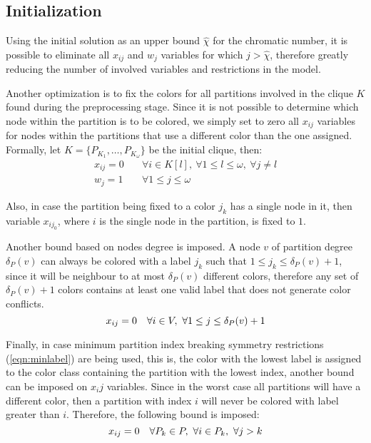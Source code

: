 \subsection{Initialization}

Using the initial solution as an upper bound $\hat{\chi}$ for the chromatic number, it is possible to eliminate all $x_{ij}$ and $w_j$ variables for which  $j > \hat{\chi}$, therefore greatly reducing the number of involved variables and restrictions in the model.

Another optimization is to fix the colors for all partitions involved in the clique $K$ found during the preprocessing stage. Since it is not possible to determine which node within the partition is to be colored, we simply set to zero all $x_{ij}$ variables for nodes within the partitions that use a different color than the one assigned. Formally, let $K = \{ P_{K_1}, \ldots, P_{K_\omega} \}$ be the initial clique, then:
\begin{align*}
x_{ij} = 0 \quad &\forall i \in K[l],\ \forall 1 \leq l \leq \omega,\ \forall j \neq l \\
w_j = 1 \quad &\forall 1 \leq j \leq \omega
\end{align*}

Also, in case the partition being fixed to a color $j_k$ has a single node in it, then variable $x_{ij_0}$, where $i$ is the single node in the partition, is fixed to $1$.

Another bound based on nodes degree is imposed. A node $v$ of partition degree $\delta_P(v)$ can always be colored with a label $j_k$ such that $1 \leq j_k \leq \delta_P(v) + 1$, since it will be neighbour to at most $\delta_P(v)$ different colors, therefore any set of $\delta_P(v) + 1$ colors contains at least one valid label that does not generate color conflicts.  
\begin{equation*}
x_{ij} = 0 \quad \forall i \in V,\ \forall 1 \leq j \leq \delta_P(v) + 1 \\
\end{equation*}

Finally, in case minimum partition index breaking symmetry restrictions (\ref{eqn:minlabel}) are being used, this is, the color with the lowest label is assigned to the color class containing the partition with the lowest index, another bound can be imposed on $x_ij$ variables. Since in the worst case all partitions will have a different color, then a partition with index $i$ will never be colored with label greater than $i$. Therefore, the following bound is imposed:
\begin{equation*}
x_{ij} = 0 \quad \forall P_k \in P,\ \forall i \in P_k,\ \forall j > k \\
\end{equation*}


